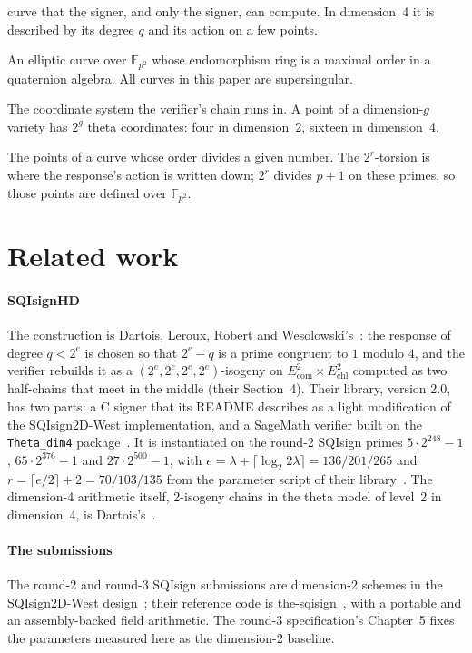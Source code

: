 \documentclass[11pt]{article}
\newcommand{\Fpq}{\mathbb{F}_{p^2}}
\newcommand{\Ecom}{E_{\mathrm{com}}}
\newcommand{\Echl}{E_{\mathrm{chl}}}
\begin{document}
\begin{description}[style=nextline, leftmargin=1.2em, itemsep=2pt]
  curve that the signer, and only the signer, can compute.  In dimension~4
  it is described by its degree $q$ and its action on a few points.
\item[supersingular curve] An elliptic curve over $\Fpq$ whose
  endomorphism ring is a maximal order in a quaternion algebra.  All
  curves in this paper are supersingular.
\item[theta model] The coordinate system the verifier's chain runs in.  A
  point of a dimension-$g$ variety has $2^g$ theta coordinates: four in
  dimension~2, sixteen in dimension~4.
\item[torsion] The points of a curve whose order divides a given number.
  The $2^r$-torsion is where the response's action is written down;
  $2^r$ divides $p+1$ on these primes, so those points are defined over
  $\Fpq$.
\end{description}

\section{Related work}
\label{sec:related}

\paragraph{SQIsignHD}
The construction is Dartois, Leroux, Robert and Wesolowski's~\cite{DLRW24}:
the response of degree $q < 2^e$ is chosen so that $2^e - q$ is a prime
congruent to $1$ modulo $4$, and the verifier rebuilds it as a
$(2^e, 2^e, 2^e, 2^e)$-isogeny on $\Ecom^2 \times \Echl^2$ computed as two
half-chains that meet in the middle (their Section~4).  Their library,
version 2.0, has two parts: a C signer that its README describes as a
light modification of the SQIsign2D-West implementation, and a SageMath
verifier built on the \texttt{Theta\_dim4} package~\cite{SQISignHDlib,
ThetaDim4}.  It is instantiated on the round-2 SQIsign primes
$5 \cdot 2^{248} - 1$, $65 \cdot 2^{376} - 1$ and $27 \cdot 2^{500} - 1$,
with $e = \lambda + \lceil \log_2 2\lambda \rceil = 136 / 201 / 265$ and
$r = \lceil e/2 \rceil + 2 = 70 / 103 / 135$ from the parameter script of
their library~\cite{SQISignHDlib}.
The dimension-4 arithmetic itself, 2-isogeny chains in the theta model of
level~2 in dimension~4, is Dartois's~\cite{Dar24}.

\paragraph{The submissions}
The round-2 and round-3 SQIsign submissions are dimension-2 schemes in the
SQIsign2D-West design~\cite{BDDF24,SQISignV2,SQISignV3}; their reference
code is the-sqisign~\cite{TheSQIsignV2,TheSQIsignV3}, with a portable and
an assembly-backed field arithmetic.  The round-3 specification's
Chapter~5 fixes the parameters measured here as the dimension-2 baseline.
\end{document}
